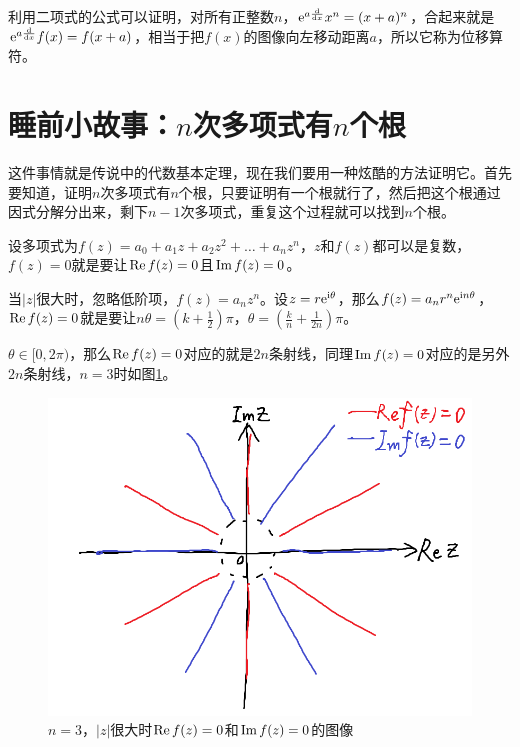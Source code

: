 利用二项式的公式可以证明，对所有正整数$n$，$\mathrm{e}^{a \frac{\mathop{}\!\mathrm{d}}{\mathop{}\!\mathrm{d} x}} x^n=(x+a)^n$，合起来就是$\mathrm{e}^{a \frac{\mathop{}\!\mathrm{d}}{\mathop{}\!\mathrm{d} x}} f(x)=f(x+a)$，相当于把$f(x)$的图像向左移动距离$a$，所以它称为位移算符。
\section{睡前小故事：$n$次多项式有$n$个根}
这件事情就是传说中的代数基本定理，现在我们要用一种炫酷的方法证明它。首先要知道，证明$n$次多项式有$n$个根，只要证明有一个根就行了，然后把这个根通过因式分解分出来，剩下$n-1$次多项式，重复这个过程就可以找到$n$个根。

设多项式为$f(z)=a_0 +a_1 z+a_2 z^2+\dots+a_n z^n$，$z$和$f(z)$都可以是复数，$f(z)=0$就是要让$\mathrm{Re}\mathop{}\! f(z)=0$且$\mathrm{Im}\mathop{}\! f(z)=0$。

当$|z|$很大时，忽略低阶项，$f(z)=a_n z^n$。设$z=r \mathrm{e}^{\mathrm{i} \theta}$，那么$f(z)=a_n r^n \mathrm{e}^{\mathrm{i} n \theta}$，$\mathrm{Re}\mathop{}\! f(z)=0$就是要让$n \theta=(k+\frac{1}{2})\pi$，$\theta=(\frac{k}{n}+\frac{1}{2n})\pi$。

$\theta \in [0,2\pi)$，那么$\mathrm{Re}\mathop{}\! f(z)=0$对应的就是$2n$条射线，同理$\mathrm{Im}\mathop{}\! f(z)=0$对应的是另外$2n$条射线，$n=3$时如图\ref{fig-poly-root-outer}。
\begin{figure}[htb]
\centering
\includegraphics[scale=0.5]{fig/poly-root-outer}
\caption{$n=3$，$|z|$很大时$\mathrm{Re}\mathop{}\! f(z)=0$和$\mathrm{Im}\mathop{}\! f(z)=0$的图像}
\label{fig-poly-root-outer}
\end{figure}

